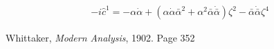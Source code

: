 \documentclass{article}
\begin{document}
\begin{align*}
-i \hat c^1 = - α  \dot{α}   + ( α  \dot{α}  \bar{α}  ^2 +  α  ^2\bar{α}  \dot{\bar{α}  }) ζ  ^2 - \bar{α}  \dot{\bar{α}  } ζ  ^4
\end{align*}

\begin{thebibliography}{9}

  Whittaker,
  \emph{Modern Analysis}, 1902. Page 352

\end{thebibliography}
\end{document}

